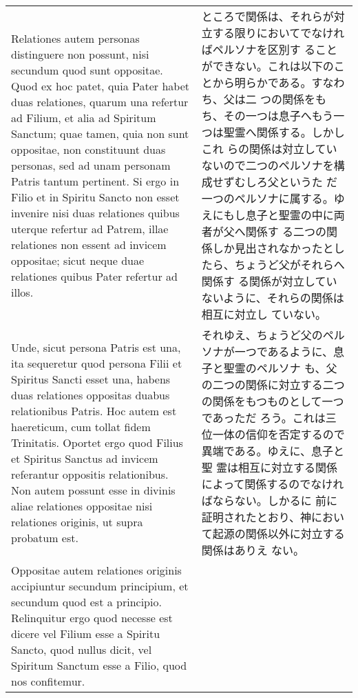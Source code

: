 \documentclass[10pt]{jsarticle} %
\begin{document}
\begin{longtable}{p{21em}p{21em}}
\\

Relationes autem personas distinguere non
possunt, nisi secundum quod sunt oppositae. Quod ex hoc patet, quia
Pater habet duas relationes, quarum una refertur ad Filium, et alia ad
Spiritum Sanctum; quae tamen, quia non sunt oppositae, non constituunt
duas personas, sed ad unam personam Patris tantum pertinent. Si ergo
in Filio et in Spiritu Sancto non esset invenire nisi duas relationes
quibus uterque refertur ad Patrem, illae relationes non essent ad
invicem oppositae; sicut neque duae relationes quibus Pater refertur
ad illos. 

&

ところで関係は、それらが対立する限りにおいてでなければペルソナを区別す
 ることができない。これは以下のことから明らかである。すなわち、父は二
 つの関係をもち、その一つは息子へもう一つは聖霊へ関係する。しかしこれ
 らの関係は対立していないので二つのペルソナを構成せずむしろ父というた
 だ一つのペルソナに属する。ゆえにもし息子と聖霊の中に両者が父へ関係す
 る二つの関係しか見出されなかったとしたら、ちょうど父がそれらへ関係す
 る関係が対立していないように、それらの関係は相互に対立し
 ていない。


\\


Unde, sicut persona Patris est una, ita sequeretur quod
persona Filii et  Spiritus Sancti esset una, habens duas relationes
oppositas duabus relationibus Patris. Hoc autem est haereticum, cum
tollat fidem Trinitatis. Oportet ergo quod Filius et  Spiritus Sanctus ad invicem referantur oppositis relationibus. Non
autem possunt esse in divinis aliae relationes oppositae nisi
relationes originis, ut supra probatum est. 




&

それゆえ、ちょうど父のペルソナが一つであるように、息子と聖霊のペルソナ
 も、父の二つの関係に対立する二つの関係をもつものとして一つであっただ
 ろう。これは三位一体の信仰を否定するので異端である。ゆえに、息子と聖
 霊は相互に対立する関係によって関係するのでなければならない。しかるに
 前に証明されたとおり、神において起源の関係以外に対立する関係はありえ
 ない。


\\


Oppositae autem relationes
originis accipiuntur secundum principium, et secundum quod est a
principio. Relinquitur ergo quod necesse est dicere vel Filium esse a
 Spiritu Sancto, quod nullus dicit, vel  Spiritum Sanctum esse a Filio,
quod nos confitemur. 


\end{longtable}
\end{document}
